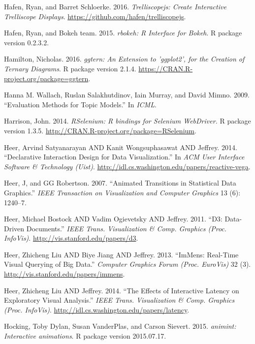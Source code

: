 \documentclass[12pt,]{isuthesis}
\begin{document}
\hypertarget{ref-trelliscopejs}{}
Hafen, Ryan, and Barret Schloerke. 2016. \emph{Trelliscopejs: Create
Interactive Trelliscope Displays}.
\url{https://github.com/hafen/trelliscopejs}.

\hypertarget{ref-rbokeh}{}
Hafen, Ryan, and Bokeh team. 2015. \emph{rbokeh: R Interface for Bokeh}.
R package version 0.2.3.2.

\hypertarget{ref-ggtern}{}
Hamilton, Nicholas. 2016. \emph{ggtern: An Extension to 'ggplot2', for
the Creation of Ternary Diagrams}. R package version 2.1.4.
\url{https://CRAN.R-project.org/package=ggtern}.

\hypertarget{ref-Wallach}{}
Hanna M. Wallach, Ruslan Salakhutdinov, Iain Murray, and David Mimno.
2009. ``Evaluation Methods for Topic Models.'' In \emph{ICML}.

\hypertarget{ref-RSelenium}{}
Harrison, John. 2014. \emph{RSelenium: R bindings for Selenium
WebDriver.} R package version 1.3.5.
\url{http://CRAN.R-project.org/package=RSelenium}.

\hypertarget{ref-vega}{}
Heer, Arvind Satyanarayan AND Kanit Wongsuphasawat AND Jeffrey. 2014.
``Declarative Interaction Design for Data Visualization.'' In \emph{ACM
User Interface Software \& Technology (Uist)}.
\url{http://idl.cs.washington.edu/papers/reactive-vega}.

\hypertarget{ref-animated-transitions}{}
Heer, J, and GG Robertson. 2007. ``Animated Transitions in Statistical
Data Graphics.'' \emph{IEEE Transaction on Visualization and Computer
Graphics} 13 (6): 1240--7.

\hypertarget{ref-Bostock:2011}{}
Heer, Michael Bostock AND Vadim Ogievetsky AND Jeffrey. 2011. ``D3:
Data-Driven Documents.'' \emph{IEEE Trans. Visualization \& Comp.
Graphics (Proc. InfoVis)}. \url{http://vis.stanford.edu/papers/d3}.

\hypertarget{ref-2013-immens}{}
Heer, Zhicheng Liu AND Biye Jiang AND Jeffrey. 2013. ``ImMens: Real-Time
Visual Querying of Big Data.'' \emph{Computer Graphics Forum (Proc.
EuroVis)} 32 (3). \url{http://vis.stanford.edu/papers/immens}.

\hypertarget{ref-2014-latency}{}
Heer, Zhicheng Liu AND Jeffrey. 2014. ``The Effects of Interactive
Latency on Exploratory Visual Analysis.'' \emph{IEEE Trans.
Visualization \& Comp. Graphics (Proc. InfoVis)}.
\url{http://idl.cs.washington.edu/papers/latency}.

\hypertarget{ref-animint}{}
Hocking, Toby Dylan, Susan VanderPlas, and Carson Sievert. 2015.
\emph{animint: Interactive animations}. R package version 2015.07.17.
\end{document}
